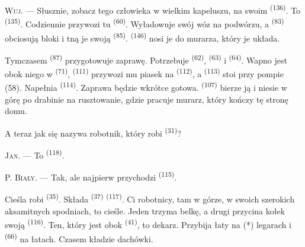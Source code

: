 \textsc{Wuj}. --- Słusznie, zobacz tego człowieka w wielkim kapeluszu, na swoim
 \textsuperscript{(136)}. To  \textsuperscript{(135)}.
Codziennie przywozi tu  \textsuperscript{(60)}. Wyładowuje swój
wóz na podwórzu, a  \textsuperscript{(83)} obciosują bloki i tną je
swoją  \textsuperscript{(85)}. 
\textsuperscript{(146)} nosi je do murarza, który je układa.

Tymczasem  \textsuperscript{(87)} przygotowuje zaprawę. Potrzebuje
 \textsuperscript{(62)},  \textsuperscript{(63)} i
 \textsuperscript{(64)}. Wapno jest obok niego w 
\textsuperscript{(71)},  \textsuperscript{(111)} przywozi mu
piasek na  \textsuperscript{(112)}, a 
\textsuperscript{(113)} stoi przy pompie (58). Napełnia 
\textsuperscript{(114)}. Zaprawa będzie wkrótce gotowa. 
\textsuperscript{(107)} bierze ją i niesie w górę po drabinie na rusztowanie, gdzie
pracuje murarz, który kończy tę stronę domu.

A teraz jak się nazywa robotnik, który robi  \textsuperscript{(31)}?

\textsc{Jan}. --- To  \textsuperscript{(118)}.

\VUsaut{3.0mm}
\VUsaut{3.0mm}

P. \textsc{Biały}. --- Tak, ale najpierw przychodzi 
\textsuperscript{(115)}.

Cieśla robi  \textsuperscript{(35)}. Składa 
\textsuperscript{(37)}  \textsuperscript{(117)}. Ci robotnicy, tam w
górze, w swoich szerokich aksamitnych spodniach, to cieśle. Jeden trzyma belkę, a drugi
przycina kołek swoją  \textsuperscript{(116)}. Ten, który jest obok
 \textsuperscript{(41)}, to dekarz. Przybija łaty na (*) legarach i
 \textsuperscript{(66)} na łatach. Czasem kładzie dachówki.


